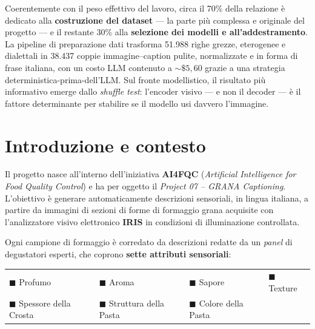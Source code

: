 \documentclass[11pt,a4paper]{article}
\begin{document}
Coerentemente con il peso effettivo del lavoro, circa il 70\% della relazione
\`e dedicato alla \textbf{costruzione del dataset} --- la parte pi\`u
complessa e originale del progetto --- e il restante 30\% alla
\textbf{selezione dei modelli e all'addestramento}. La pipeline di
preparazione dati trasforma 51.988 righe grezze, eterogenee e dialettali in
38.437 coppie immagine--caption pulite, normalizzate e in forma di frase
italiana, con un costo LLM contenuto a $\sim\$5{,}60$ grazie a una strategia
deterministica-prima-dell'LLM. Sul fronte modellistico, il risultato pi\`u
informativo emerge dallo \emph{shuffle test}: l'encoder visivo --- e non il
decoder --- \`e il fattore determinante per stabilire se il modello usi
davvero l'immagine.

\vspace{0.4cm}
{\small\tableofcontents}
\newpage

\section{Introduzione e contesto}

Il progetto nasce all'interno dell'iniziativa \textbf{AI4FQC}
(\textit{Artificial Intelligence for Food Quality Control}) e ha per oggetto
il \emph{Project 07 -- GRANA Captioning}. L'obiettivo \`e generare
automaticamente descrizioni sensoriali, in lingua italiana, a partire da
immagini di sezioni di forme di formaggio grana acquisite con l'analizzatore
visivo elettronico \textbf{IRIS} in condizioni di illuminazione controllata.

Ogni campione di formaggio \`e corredato da descrizioni redatte da un
\emph{panel} di degustatori esperti, che coprono \textbf{sette attributi
sensoriali}:
\begin{center}
\small
\begin{tabular}{@{}llll@{}}
\textcolor{prim}{$\blacksquare$} Profumo &
\textcolor{prim}{$\blacksquare$} Aroma &
\textcolor{prim}{$\blacksquare$} Sapore &
\textcolor{prim}{$\blacksquare$} Texture \\
\textcolor{prim}{$\blacksquare$} Spessore della Crosta &
\textcolor{prim}{$\blacksquare$} Struttura della Pasta &
\textcolor{prim}{$\blacksquare$} Colore della Pasta & \\
\end{tabular}
\end{center}
\end{document}
